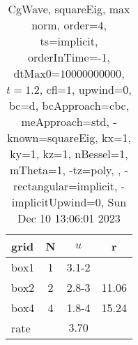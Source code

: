\begin{table}[H]\tableFont %
\begin{center}
\begin{tabular}{|l|c|c|c|} \hline 
grid  & N &  $ u $ & r \\ \hline 
      box1 &     1 & \num{3.1}{-2} &        \\ \hline
      box2 &     2 & \num{2.8}{-3} & 11.06  \\ \hline
      box4 &     4 & \num{1.8}{-4} & 15.24  \\ \hline
    rate             &       &  $3.70$       &       \\ \hline
\end{tabular}
\caption{CgWave, squareEig, max norm, order=$4$, ts=implicit, orderInTime=-1, dtMax0=$10000000000$, $t=1.2$, cfl=$1$, upwind=0, bc=d, bcApproach=cbc, meApproach=std, -known=squareEig, kx=1, ky=1, kz=1, nBessel=1, mTheta=1, -tz=poly, , -rectangular=implicit, -implicitUpwind=0, Sun Dec 10 13:06:01 2023}\label{table:squareEigOrder4max}
\end{center}
\end{table}
